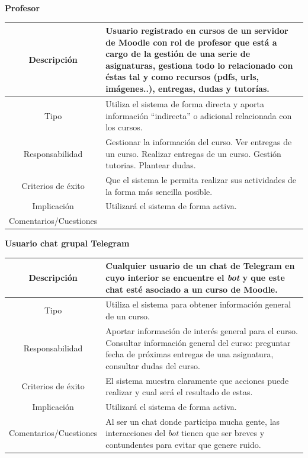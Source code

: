\newpage
\textbf{Profesor}
\begin{table}[H]
\medskip 
\begin{tabular}{|c|p{10cm}|}
\hline
{ Descripción } & {Usuario registrado en cursos de un servidor de Moodle con rol de profesor que está a cargo de la gestión de una serie de asignaturas, gestiona todo lo relacionado con éstas tal y como recursos (pdfs, urls, imágenes..), entregas, dudas y tutorías.}\\
\hline
{ Tipo } & { Utiliza el sistema de forma directa y aporta información “indirecta” o adicional relacionada con los cursos.}  \\
\hline
{ Responsabilidad } & { Gestionar la información del curso.
Ver entregas de un curso.
Realizar entregas de un curso.
Gestión tutorias.
Plantear dudas.}  \\
\hline
{ Criterios de éxito }& { Que el sistema le permita realizar sus actividades de la forma más sencilla posible.}\\
\hline
{ Implicación }& { Utilizará el sistema de forma activa.} \\
\hline
{ Comentarios/Cuestiones }& { } \\
\hline


\end{tabular}
\end{table}


\textbf{Usuario chat grupal Telegram}

\begin{table}[H]
\begin{tabular}{|c|p{10cm}|}
\hline
{ Descripción } & {Cualquier usuario de un chat de Telegram en cuyo interior se encuentre el \textit{bot} y que este chat esté asociado a un curso de Moodle. }\\
\hline 
{ Tipo } & { Utiliza el sistema para obtener información general de un curso.}  \\
\hline
{ Responsabilidad } & { Aportar información de interés general para el  curso.
Consultar información general del curso: preguntar fecha de próximas entregas de una asignatura, consultar dudas del curso.
}  \\
\hline
{ Criterios de éxito }& { El sistema muestra claramente que acciones puede realizar y cual será el resultado de estas.}\\
\hline
{ Implicación }& { Utilizará el sistema de forma activa.} \\
\hline
{ Comentarios/Cuestiones }& { Al ser un chat donde participa mucha gente, las interacciones del \textit{bot} tienen que ser breves y contundentes para evitar que genere ruido.} \\
\hline

\end{tabular}
\end{table}


